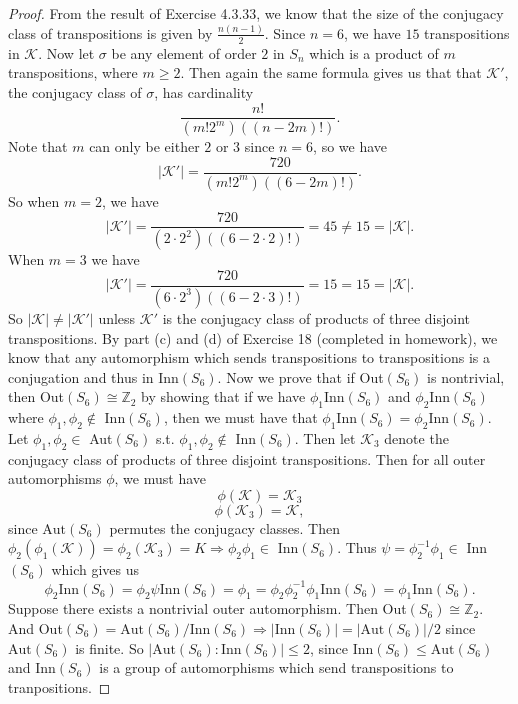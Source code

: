 \documentclass[10pt,oneside,reqno]{amsart}
\theoremstyle{plain}
\theoremstyle{definition}
\begin{document}
\begin{proof}
From the result of Exercise 4.3.33, we know that the size of the conjugacy class of transpositions is given by $\frac{n(n-1)}{2}$. Since $n = 6$, we have $15$ transpositions in $\mathcal{K}$. Now let $\sigma$ be any element of order $2$ in $S_n$ which is a product of $m$ transpositions, where $m \geq 2$. Then again the same formula gives us that that $\mathcal{K}'$, the conjugacy class of $\sigma$, has cardinality
\[\frac{n!}{(m!2^m)((n - 2m)!)}. \]
Note that $m$ can only be either $2$ or $3$ since $n = 6$, so we have 
\[|\mathcal{K}'| = \frac{720}{(m!2^m)((6 - 2m)!)}.\]
So when $m = 2$, we have \[|\mathcal{K}'| = \frac{720}{(2\cdot 2^2)((6 - 2\cdot2)!)} = 45 \neq 15 = |\mathcal{K}|.\] When $m = 3$ we have \[|\mathcal{K}'| = \frac{720}{(6\cdot 2^3)((6 - 2\cdot3)!)} = 15 = 15 = |\mathcal{K}|.\]
So $|\mathcal{K}| \neq |\mathcal{K}'|$ unless $\mathcal{K}'$ is the conjugacy class of products of three disjoint transpositions. By part (c) and (d) of Exercise 18 (completed in homework), we know that any automorphism which sends transpositions to transpositions is a conjugation and thus in $\text{Inn}(S_6)$. Now we prove that if Out$(S_6)$ is nontrivial, then Out$(S_6) \cong \mathbb{Z}_2$ by showing that if we have $\phi_1$Inn$(S_6)$ and $\phi_2$Inn$(S_6)$ where $\phi_1,\phi_2 \notin $ Inn$(S_6)$, then we must have that $\phi_1$Inn$(S_6)=\phi_2$Inn$(S_6)$. Let $\phi_1,\phi_2 \in $ Aut$(S_6)$ s.t. $\phi_1,\phi_2 \notin $ Inn$(S_6)$. Then let $\mathcal{K}_3$ denote the conjugacy class of products of three disjoint transpositions. Then for all outer automorphisms $\phi$, we must have
\[\phi(\mathcal{K}) = \mathcal{K}_3\]
\[\phi(\mathcal{K}_3) = \mathcal{K},\]
since $\text{Aut}(S_6)$ permutes the conjugacy classes. Then $\phi_2(\phi_1(\mathcal{K})) = \phi_2(\mathcal{K}_3) = K \Rightarrow \phi_2\phi_1 \in$ Inn$(S_6)$. Thus $\psi = \phi_2^{-1}\phi_1 \in$ Inn$(S_6)$ which gives us
\[\phi_2\text{Inn}(S_6)=\phi_2\psi\text{Inn}(S_6) = \phi_1 =\phi_2\phi_2^{-1}\phi_1\text{Inn}(S_6) = \phi_1\text{Inn}(S_6).\]
Suppose there exists a nontrivial outer automorphism. Then Out$(S_6) \cong \mathbb{Z}_2$. And Out$(S_6) = \text{Aut}(S_6)/\text{Inn}(S_6) \Rightarrow |\text{Inn}(S_6)| = |\text{Aut}(S_6)|/2$ since $\text{Aut}(S_6)$ is finite. So $|\text{Aut}(S_6): \text{Inn}(S_6)| \leq 2$, since $\text{Inn}(S_6) \leq \text{Aut}(S_6)$ and $\text{Inn}(S_6)$ is a group of automorphisms which send transpositions to tranpositions. 
\end{proof}
\end{document}

